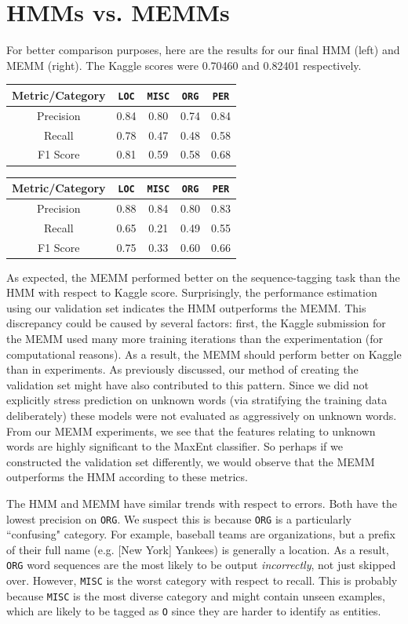 \documentclass[12pt]{article}
\begin{document}
\section{HMMs vs. MEMMs}
For better comparison purposes, here are the results for our final HMM (left) and MEMM (right). The Kaggle scores were 0.70460 and 0.82401 respectively.
\begin{center}
	\begin{tabular}{|c|c|c|c|c|}
		\hline
		\textbf{Metric/Category} & {\tt LOC} & {\tt MISC} & {\tt ORG} & {\tt PER}\\
		\hline
		Precision & 0.84 & 0.80 & 0.74 & 0.84\\
		\hline
		Recall & 0.78 & 0.47 & 0.48 & 0.58\\
		\hline
		F1 Score & 0.81 & 0.59 & 0.58 & 0.68\\
		\hline
	\end{tabular}
	\begin{tabular}{|c|c|c|c|c|}
		\hline
		\textbf{Metric/Category} & {\tt LOC} & {\tt MISC} & {\tt ORG} & {\tt PER}\\
		\hline
		Precision & 0.88 & 0.84 & 0.80 & 0.83\\
		\hline
		Recall & 0.65 & 0.21 & 0.49 & 0.55\\
		\hline
		F1 Score & 0.75 & 0.33 & 0.60 & 0.66\\
		\hline
	\end{tabular}
\end{center}
As expected, the MEMM performed better on the sequence-tagging task than the HMM with respect to Kaggle score. Surprisingly, the performance estimation using our validation set indicates the HMM outperforms the MEMM. This discrepancy could be caused by several factors: first, the Kaggle submission for the MEMM used many more training iterations than the experimentation (for computational reasons). As a result, the MEMM should perform better on Kaggle than in experiments. As previously discussed, our method of creating the validation set might have also contributed to this pattern. Since we did not explicitly stress prediction on unknown words (via stratifying the training data deliberately) these models were not evaluated as aggressively on unknown words. From our MEMM experiments, we see that the features relating to unknown words are highly significant to the MaxEnt classifier. So perhaps if we constructed the validation set differently, we would observe that the MEMM outperforms the HMM according to these metrics. 

The HMM and MEMM have similar trends with respect to errors. Both have the lowest precision on {\tt ORG}. We suspect this is because {\tt ORG} is a particularly ``confusing" category. For example, baseball teams are organizations, but a prefix of their full name (e.g. [New York] Yankees) is generally a location. As a result, {\tt ORG} word sequences are the most likely to be output \emph{incorrectly}, not just skipped over. However, {\tt MISC} is the worst category with respect to recall. This is probably because {\tt MISC} is the most diverse category and might contain unseen examples, which are likely to be tagged as {\tt O} since they are harder to identify as entities. 
\end{document}
